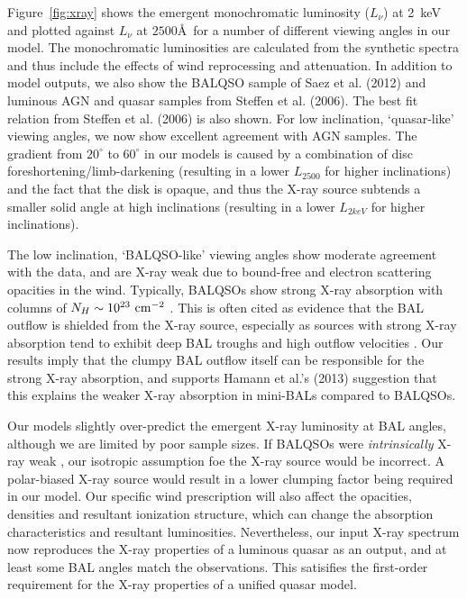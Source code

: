 \documentclass[useAMS,usenatbib]{mn2e_x}
\begin{document}
Figure~\ref{fig:xray} shows the emergent
monochromatic luminosity ($L_\nu$) at 2~keV and 
plotted against $L_\nu$ at $2500$\AA\ for a number of different viewing angles in our model.
The monochromatic luminosities are calculated from the synthetic spectra and thus include
the effects of wind reprocessing and attenuation. In addition to model outputs,
we also show the BALQSO sample of Saez et al. (2012) and luminous AGN and quasar
samples from Steffen et al. (2006). The best fit relation from Steffen et al. (2006) 
is also shown. For low inclination, `quasar-like' viewing angles,
we now show excellent agreement with AGN samples. The gradient from $20^\circ$ to
$60^\circ$ in our models is caused by a combination of disc foreshortening/limb-darkening 
(resulting in a lower $L_{2500}$ for higher inclinations) and the fact that the disk 
is opaque, and thus the X-ray source subtends a smaller solid angle at high inclinations
(resulting in a lower $L_{2keV}$ for higher inclinations). 



The low inclination, `BALQSO-like' viewing angles show moderate agreement with the data,
and are X-ray weak due to bound-free and electron scattering opacities in the wind.
Typically, BALQSOs show strong X-ray absorption with columns 
of $N_H\sim10^{23}~\rm{cm^{-2}}$ 
\citep{green1996,mathur2000,green2001,grupemathur2003}.
This is often cited as evidence that the BAL outflow is shielded from
the X-ray source, especially as sources with strong X-ray absorption tend
to exhibit deep BAL troughs and high outflow velocities 
\citep{brandt2000,laorbrandt2002,gallagher2006}.
Our results imply that the clumpy BAL outflow
itself can be responsible for the strong X-ray absorption, 
and supports Hamann et al.'s (2013) suggestion that 
this explains the weaker X-ray absorption in mini-BALs 
compared to BALQSOs.

Our models slightly over-predict the emergent X-ray luminosity at BAL angles, 
although we are limited by poor sample sizes. 
If BALQSOs were {\em intrinsically} 
X-ray weak \citep[as suggested by, e.g.][]{morabito2013},
our isotropic assumption foe the X-ray source would be incorrect. 
A polar-biased X-ray source would result in a lower clumping factor being
required in our model. Our specific wind
prescription will also affect the opacities, densities and resultant
ionization structure, which can change the absorption characteristics and resultant
luminosities.
Nevertheless, our input X-ray spectrum
now reproduces the X-ray properties of a luminous quasar as an output,
and at least some BAL angles match the observations.
This satisifies the first-order requirement for the X-ray properties of 
a unified quasar model.
\end{document}
